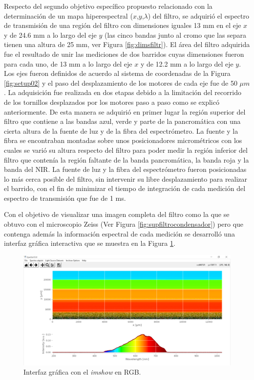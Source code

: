 Respecto del segundo objetivo específico propuesto relacionado con la determinación de un mapa hiperespectral ($\textit{x}$,$\textit{y}$,$\lambda$) del filtro, se adquirió el espectro de transmisión de una región del filtro con dimensiones iguales 13 mm en el eje $\textit{x}$ y de 24.6 mm a lo largo del eje $\textit{y}$ (las cinco bandas junto al cromo que las separa tienen una altura de 25 mm, ver Figura \ref{fig:dimsfiltr}). El área del filtro adquirida fue el resultado de unir las mediciones de dos barridos cuyas dimensiones fueron para cada uno, de 13 mm a lo largo del eje $\textit{x}$ y de 12.2 mm a lo largo del eje $\textit{y}$. Los ejes fueron definidos de acuerdo al sistema de coordenadas de la Figura \ref{fig:setup02} y el paso del desplazamiento de los motores de cada eje fue de 50 $\mu m$. La adquisición fue realizada en dos etapas debido a la limitación del recorrido de los tornillos desplazados por los motores paso a paso como se explicó anteriormente. De esta manera se adquirió en primer lugar la región superior del filtro que contiene a las bandas azul, verde y parte de la pancromática con una cierta altura de la fuente de luz y de la fibra del espectrómetro. La fuente y la fibra se encontraban montadas sobre unos posicionadores micrométricos con los cuales se varió su altura respecto del filtro para poder medir la región inferior del filtro que contenía la región faltante de la banda pancromática, la banda roja y la banda del NIR. La fuente de luz y la fibra del espectrómetro fueron posicionadas lo más cerca posible del filtro, sin intervenir su libre desplazamiento para realizar el barrido, con el fin de minimizar el tiempo de integración de cada medición del espectro de transmisión que fue de 1 ms.

Con el objetivo de visualizar una imagen completa del filtro como la que se obtuvo con el microscopio Zeiss (Ver Figura \ref{fig:supfiltrocondensador}) pero que contenga además la información espectral de cada medición se desarrolló una interfaz gráfica interactiva que se muestra en la Figura \ref{fig:GUI00}.

\begin{figure}[H]
	\centering
	\includegraphics[width=1.0\textwidth]{Figs/microespectrometro/guirgb.png}
	\caption{Interfaz gráfica con el \textit{imshow} en RGB.}
	\label{fig:GUI00}
\end{figure}


